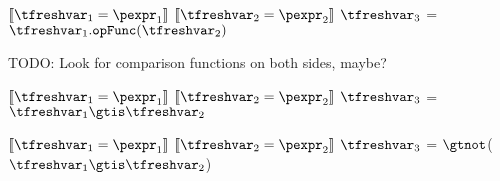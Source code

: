 \documentclass{article}
\begin{document}
\begin{mathpar}
\end{mathpar}

\newsavebox{\compareBox}
\begin{lrbox}{\compareBox}
\begin{python}
$\meaningof{\tfreshvar_1 = \pexpr_1}$
$\meaningof{\tfreshvar_2 = \pexpr_2}$
$\tfreshvar_3$ = $\tfreshvar_1.\mathtt{opFunc}(\tfreshvar_2)$
\end{python}
\end{lrbox}

TODO: Look for comparison functions on both sides, maybe?

\begin{mathpar}
\end{mathpar}

\newsavebox{\compareIsBox}
\begin{lrbox}{\compareIsBox}
\begin{python}
$\meaningof{\tfreshvar_1 = \pexpr_1}$
$\meaningof{\tfreshvar_2 = \pexpr_2}$
$\tfreshvar_3$ = $\tfreshvar_1 \gtis \tfreshvar_2$
\end{python}
\end{lrbox}

\begin{mathpar}
\end{mathpar}

\newsavebox{\compareIsNotBox}
\begin{lrbox}{\compareIsNotBox}
\begin{python}
$\meaningof{\tfreshvar_1 = \pexpr_1}$
$\meaningof{\tfreshvar_2 = \pexpr_2}$
$\tfreshvar_3$ = $\gtnot$($\tfreshvar_1 \gtis \tfreshvar_2$)
\end{python}
\end{lrbox}
\end{document}
